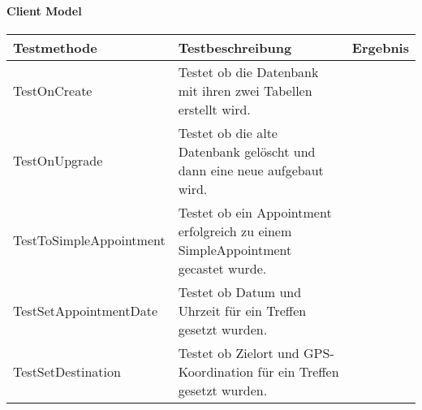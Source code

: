 	\paragraph{Client Model}
	\begin{table}[H]
		{
			\begin{tabular}{|p{}|p{}|>{\centering}p{}|}
				\hline
				Testmethode & Testbeschreibung & Ergebnis\tabularnewline
				\hline
				\hspace{0pt}TestOnCreate & Testet ob die Datenbank mit ihren zwei Tabellen erstellt wird. &			\checkmark\tabularnewline
				\hspace{0pt}TestOnUpgrade & Testet ob die alte Datenbank gelöscht und dann eine neue aufgebaut wird. & \checkmark\tabularnewline
						
				\hspace{0pt}TestToSimpleAppointment & Testet ob ein Appointment erfolgreich zu einem SimpleAppointment gecastet wurde. & \checkmark\tabularnewline
				\hspace{0pt}TestSetAppointmentDate & Testet ob Datum und Uhrzeit für ein Treffen gesetzt wurden. & \checkmark\tabularnewline
				\hspace{0pt}TestSetDestination & Testet ob Zielort und GPS-Koordination für ein Treffen gesetzt wurden. & \checkmark\tabularnewline
				

\end{tabular}}
\end{table}
